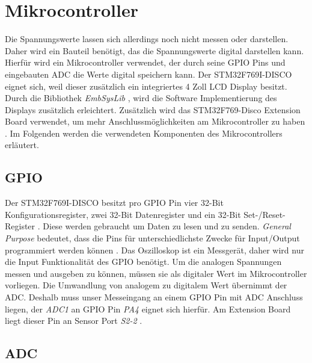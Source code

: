 \section{Mikrocontroller}
\label{Mikrocontroller}

Die Spannungswerte lassen sich allerdings noch nicht messen oder darstellen.
Daher wird ein Bauteil benötigt, das die Spannungswerte digital darstellen kann.
Hierfür wird ein Mikrocontroller verwendet, der durch seine GPIO Pins und eingebauten ADC die Werte digital speichern kann.
Der STM32F769I-DISCO eignet sich, weil dieser zusätzlich ein integriertes 4 Zoll LCD Display
besitzt\cite{MikroControllerDatasheet_1}.
Durch die Bibliothek \textit{EmbSysLib} \cite{EmbSysLib}, wird die Software Implementierung des Displays zusätzlich
erleichtert. Zusätzlich wird das STM32F769-Disco Extension Board verwendet, um mehr
Anschlussmöglichkeiten am Mikrocontroller zu haben \cite{MikrocontrollerExtension}.
Im Folgenden werden die verwendeten Komponenten des Mikrocontrollers erläutert.

\subsection{GPIO}
Der STM32F769I-DISCO besitzt pro GPIO Pin vier 32-Bit Konfigurationsregister, zwei 32-Bit Datenregister
und ein 32-Bit Set-/Reset-Register \cite{MikroControllerDatasheet_1}.
Diese werden gebraucht um Daten zu lesen und zu senden.
\textit{General Purpose} bedeutet, dass die Pins für unterschiedlichste Zwecke für
Input/Output programmiert werden können \cite{RPI-GPIO}. \newline
Das Oszilloskop ist ein Messgerät, daher wird nur die Input Funktionalität des GPIO benötigt.
Um die analogen Spannungen messen und ausgeben zu können, müssen sie als digitaler Wert
im Mikrocontroller vorliegen. \newline
Die Umwandlung von analogem zu digitalem Wert übernimmt der ADC\cite{MikroControllerDatasheet_1}.
Deshalb muss unser Messeingang an einem GPIO Pin mit ADC Anschluss liegen, der \textit{ADC1} an GPIO Pin
\textit{PA4} eignet sich hierfür\cite{STM32F769_PinLayout, MikroControllerDatasheet_Pins}.
Am Extension Board liegt dieser Pin an Sensor Port \textit{S2-2} \cite{MikrocontrollerExtension}.


\subsection{ADC}

